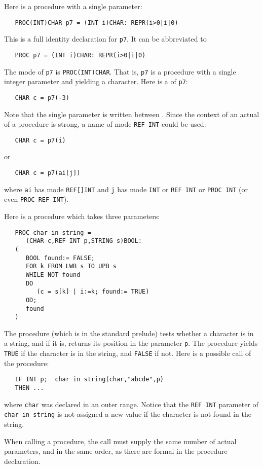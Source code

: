 Here is a procedure with a single parameter:
\begin{verbatim}
   PROC(INT)CHAR p7 = (INT i)CHAR: REPR(i>0|i|0)
\end{verbatim}
\noindent
This is a full identity declaration for \verb|p7|. It can be
abbreviated to
\begin{verbatim}
   PROC p7 = (INT i)CHAR: REPR(i>0|i|0)
\end{verbatim}
\noindent
The mode of \verb|p7| is \verb|PROC(INT)CHAR|. That is, \verb|p7| is a
procedure with a single integer parameter and yielding a character.
Here is a  of \verb|p7|:
\begin{verbatim}
   CHAR c = p7(-3)
\end{verbatim}
\noindent
Note that the single parameter is written between
. Since the context of an actual
 of a procedure is strong, a name of
mode \verb|REF INT| could be used:
\begin{verbatim}
   CHAR c = p7(i)
\end{verbatim}
\noindent
or
\begin{verbatim}
   CHAR c = p7(ai[j])
\end{verbatim}
\noindent
where \verb|ai| has mode \verb|REF[]INT| and \verb|j| has mode
\verb|INT| or \verb|REF INT| or \verb|PROC INT| (or even
\verb|PROC REF INT|).

Here is a procedure which takes three parameters:
\begin{verbatim}
   PROC char in string =
      (CHAR c,REF INT p,STRING s)BOOL:
   (
      BOOL found:= FALSE;
      FOR k FROM LWB s TO UPB s
      WHILE NOT found
      DO
         (c = s[k] | i:=k; found:= TRUE)
      OD;
      found
   )
\end{verbatim}
\noindent
{}
The procedure (which is in the standard prelude) tests whether a
character is in a string, and if it is, returns its position in the
parameter \verb|p|. The procedure yields \verb|TRUE| if the character
is in the string, and \verb|FALSE| if not. Here is a possible call of
the procedure:
\begin{verbatim}
   IF INT p;  char in string(char,"abcde",p)
   THEN ...
\end{verbatim}
\noindent
where \verb|char| was declared in an outer range. Notice that the
\verb|REF INT| parameter of \verb|char in string| is not assigned a
new value if the character is not found in the string.

When calling a procedure, the call must supply the same number
of actual parameters, and in the same order, as there are formal
 in the procedure declaration.

